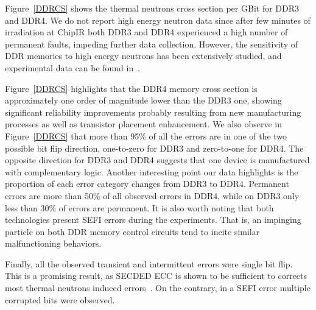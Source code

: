 Figure~\ref{DDRCS} shows the thermal neutrons cross section per GBit for DDR3 and DDR4. We do not report high energy neutron data since after few minutes of irradiation at ChipIR both DDR3 and DDR4 experienced a high number of permanent faults, impeding further data collection. However, the sensitivity of DDR memories to high energy neutrons has been extensively studied, and experimental data can be found in~\cite{constantinescu2002impact,sridharan2013feng,quinnDDR,guertin2017}.

Figure~\ref{DDRCS} highlights that the DDR4 memory cross section is approximately one order of magnitude lower than the DDR3 one, showing significant reliability improvements probably resulting from new manufacturing processes as well as transistor placement enhancement. We also observe in Figure~\ref{DDRCS} that more than 95\% of all the errors are in one of the two possible bit flip direction, one-to-zero for DDR3 and zero-to-one for DDR4. The opposite direction for DDR3 and DDR4 suggests that one device is manufactured with complementary logic. 
Another interesting point our data highlights is the proportion of each error category changes from DDR3 to DDR4. Permanent errors are more than 50\% of all observed errors in DDR4, while on DDR3 only less than 30\% of errors are permanent. It is also worth noting that both technologies present SEFI errors during the experiments. That is, an impinging particle on both DDR memory control circuits tend to incite similar malfunctioning behaviors.

Finally, all the observed transient and intermittent errors were single bit
flip. This is a promising result, as SECDED ECC is shown to be sufficient to
corrects most thermal neutrons induced errors~\cite{sridharan2012study}. On the contrary, in a SEFI error multiple corrupted bits were observed.









